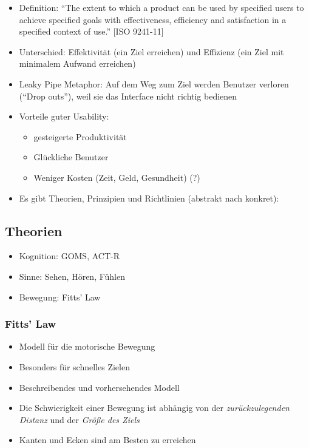 \documentclass[a4paper,10pt]{article}
\begin{document}
\begin{itemize}
	\item Definition: “The extent to which a product can be used by specified users to achieve specified goals with effectiveness, efficiency and satisfaction in a specified context of use.” [ISO 9241-11]
	\item Unterschied: Effektivität (ein Ziel erreichen) und Effizienz (ein Ziel mit minimalem Aufwand erreichen)
	\item Leaky Pipe Metaphor: Auf dem Weg zum Ziel werden Benutzer verloren (“Drop outs”), weil sie das Interface nicht richtig bedienen
	\item Vorteile guter Usability:
	\begin{itemize}
		\item gesteigerte Produktivität
		\item Glückliche Benutzer
		\item Weniger Kosten (Zeit, Geld, Gesundheit) (?)
	\end{itemize}
	\item Es gibt Theorien, Prinzipien und Richtlinien (abstrakt nach konkret):
\end{itemize}

\subsection{Theorien}
\begin{itemize}
	\item Kognition: GOMS, ACT-R
	\item Sinne: Sehen, Hören, Fühlen
	\item Bewegung: Fitts' Law
\end{itemize}

\subsubsection{Fitts' Law}
\begin{itemize}
	\item Modell für die motorische Bewegung
	\item Besonders für schnelles Zielen
	\item Beschreibendes und vorhersehendes Modell
	\item Die Schwierigkeit einer Bewegung ist abhängig von der \emph{zurückzulegenden Distanz} und der \emph{Größe des Ziels}
	\item Kanten und Ecken sind am Besten zu erreichen
\end{itemize}
\end{document}
